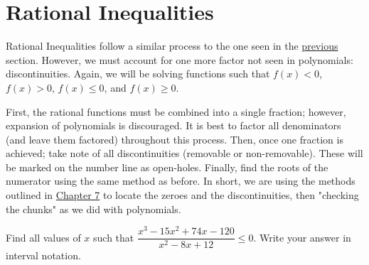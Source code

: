 \documentclass[lang=en,11pt]{elegantbook}
\begin{document}
\section{Rational Inequalities}
\noindent Rational Inequalities follow a similar process to the one seen in the \hyperlink{section.14.2}{previous} section.  However, we must account for one more factor not seen in polynomials: discontinuities. Again, we will be solving functions such that $f(x)<0$, $f(x)>0$, $f(x)\leq 0$, and $f(x)\geq 0$.

First, the rational functions must be combined into a single fraction; however, expansion of polynomials is discouraged.  It is best to factor all denominators (and leave them factored) throughout this process.  Then, once one fraction is achieved; take note of all discontinuities (removable or non-removable).  These will be marked on the number line as open-holes.  Finally, find the roots of the numerator using the same method as before.  In short, we are using the methods outlined in \hyperlink{chapter.7}{Chapter 7} to locate the zeroes and the discontinuities, then "checking the chunks" as we did with polynomials.
\begin{example}
Find all values of $x$ such that $\dfrac{x^3-15x^2+74x-120}{x^2-8x+12}\leq 0$.  Write your answer in interval notation.
\end{example}
\end{document}
